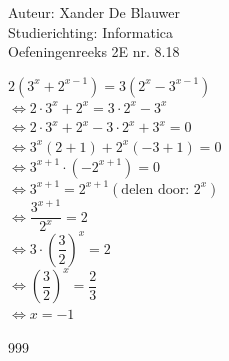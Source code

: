 \documentclass[a4paper]{article}
\begin{document}
\noindent \large Auteur: Xander De Blauwer \\
\noindent \large Studierichting: Informatica\\
\noindent \large Oefeningenreeks 2E nr. 8.18\\

\medskip

\normalsize





$2\left(3^x + 2^{x-1}\right) = 3(2^x - 3^{x-1})$ \\

$\Leftrightarrow 2\cdot 3^x + 2^x = 3 \cdot 2^x - 3^x$ \\

$\Leftrightarrow 2\cdot 3^x + 2^x - 3\cdot 2^x + 3^x = 0$ \\

$\Leftrightarrow 3^x(2+1) + 2^x(-3+1) = 0$ \\

$\Leftrightarrow 3^{x+1} \cdot (-2^{x+1}) = 0$ \\

$\Leftrightarrow 3^{x+1} = 2^{x+1} (\text{delen door: } 2^x)$ \\

$\Leftrightarrow \dfrac{3^{x+1}}{2^x} = 2$ \\

$\Leftrightarrow 3 \cdot \left(\dfrac{3}{2}\right)^x = 2$ \\
  
$\Leftrightarrow \left(\dfrac{3}{2}\right)^x = \dfrac{2}{3}$ \\

$\Leftrightarrow x = -1$

\begin{thebibliography}{999}
\end{thebibliography}
\end{document}
